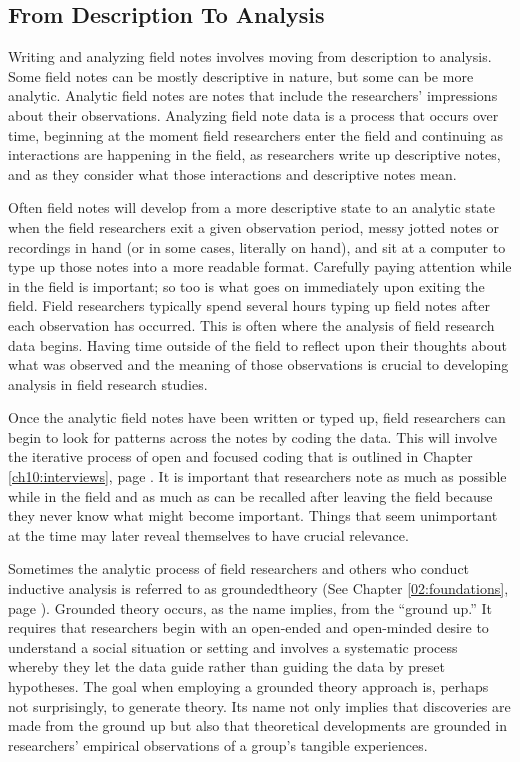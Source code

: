 \subsection{From Description To Analysis}

Writing and analyzing field notes involves moving from description to analysis. Some field notes can be mostly descriptive in nature, but some can be more analytic. Analytic field notes are notes that include the researchers' impressions about their observations. Analyzing field note data is a process that occurs over time, beginning at the moment field researchers enter the field and continuing as interactions are happening in the field, as researchers write up descriptive notes, and as they consider what those interactions and descriptive notes mean.

Often field notes will develop from a more descriptive state to an analytic state when the field researchers exit a given observation period, messy jotted notes or recordings in hand (or in some cases, literally on hand), and sit at a computer to type up those notes into a more readable format. Carefully paying attention while in the field is important; so too is what goes on immediately upon exiting the field. Field researchers typically spend several hours typing up field notes after each observation has occurred. This is often where the analysis of field research data begins. Having time outside of the field to reflect upon their thoughts about what was observed and the meaning of those observations is crucial to developing analysis in field research studies.

Once the analytic field notes have been written or typed up, field researchers can begin to look for patterns across the notes by coding the data. This will involve the iterative process of open and focused coding that is outlined in Chapter \ref{ch10:interviews}, page \pageref{ch10:interviews}. It is important that researchers note as much as possible while in the field and as much as can be recalled after leaving the field because they never know what might become important. Things that seem unimportant at the time may later reveal themselves to have crucial relevance.

Sometimes the analytic process of field researchers and others who conduct inductive analysis is referred to as \gls{groundedtheory} (See Chapter \ref{02:foundations}, page \pageref{02:foundations}). Grounded theory occurs, as the name implies, from the ``ground up.'' It requires that researchers begin with an open-ended and open-minded desire to understand a social situation or setting and involves a systematic process whereby they let the data guide rather than guiding the data by preset hypotheses. The goal when employing a grounded theory approach is, perhaps not surprisingly, to generate theory. Its name not only implies that discoveries are made from the ground up but also that theoretical developments are grounded in researchers' empirical observations of a group's tangible experiences.

